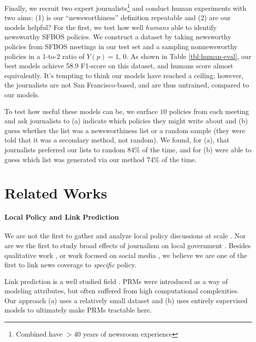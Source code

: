 \documentclass[11pt]{article}
\begin{document}
Finally, we recruit two expert journalists\footnote{Combined have $>40$ years of newsroom experience} and conduct human experiments with two aims: (1) is our ``newsworthiness'' definition repeatable and (2) are our models helpful? For the first, we test how well \textit{humans} able to identify newsworthy SFBOS policies. We construct a dataset by taking newsworthy policies from SFBOS meetings in our test set and a sampling nonnewsworthy policies in a 1-to-2 ratio of $Y(p)=1$, $0$. As shown in Table \ref{tbl:human-eval}, our best models achieve 58.9 F1-score on this dataset, and humans score almost equivalently. It's tempting to think our models have reached a ceiling; however, the journalists are not San Francisco-based, and  are thus untrained, compared to our models.

To test how useful these models can be, we surface $10$ policies from each meeting and ask journalists to (a) indicate which policies they might write about and (b) guess whether the list was a newsworthiness list or a random sample (they were told that it was a secondary method, not random). We found, for (a), that journalists preferred our lists to random 84\% of the time, and for (b) were able to guess which list was generated via our method 74\% of the time.


\section{Related Works}

\paragraph{Local Policy and Link Prediction} We are not the first to gather and analyze local policy discussions at scale \cite{sorens2008us, brown2021council, maxfield2022councils, barari2023localview}. Nor are we the first to study broad effects of journalism on local government \cite{hamilton2016democracy, baekgaard2014local, garz2017politicians}. Besides qualitative work \cite{felt2015incessant}, or work focused on social media \cite{graham2015role}, we believe we are one of the first to link news coverage to \textit{specific} policy. 

Link prediction is a well studied field \cite{kumar2020link}. PRMs were introduced \cite{getoor2002learning, taskar2003link} as a way of modeling attributes, but often suffered from high computational complexities. Our approach (a) uses a relatively small dataset and (b) uses entirely supervised models to ultimately make PRMs tractable here.
\end{document}
